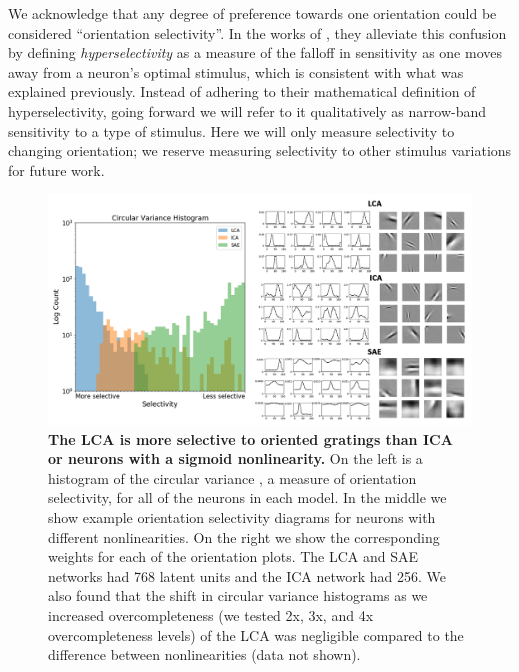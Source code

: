 We acknowledge that any degree of preference towards one orientation could be considered ``orientation selectivity''.
In the works of \parencite{golden2016conjectures,vilankar2017selectivity}, they alleviate this confusion by defining \textit{hyperselectivity} as a measure of the falloff in sensitivity as one moves away from a neuron's optimal stimulus, which is consistent with what was explained previously.
Instead of adhering to their mathematical definition of hyperselectivity, going forward we will refer to it qualitatively as narrow-band sensitivity to a type of stimulus.
Here we will only measure selectivity to changing orientation; we reserve measuring selectivity to other stimulus variations for future work.

\begin{figure}[h!]
    \centering
    \includegraphics[width=\textwidth]{figures/circular_variance_histogram.png}
    \caption{\textbf{The LCA is more selective to oriented gratings than ICA or neurons with a sigmoid nonlinearity.} On the left is a histogram of the circular variance \parencite{ringach2002orientation}, a measure of orientation selectivity, for all of the neurons in each model. In the middle we show example orientation selectivity diagrams for neurons with different nonlinearities. On the right we show the corresponding weights for each of the orientation plots. The LCA and SAE networks had 768 latent units and the ICA network had 256. We also found that the shift in circular variance histograms as we increased overcompleteness (we tested 2x, 3x, and 4x overcompleteness levels) of the LCA was negligible compared to the difference between nonlinearities (data not shown).}
    \label{fig:ch4_orientation_selectivity}
\end{figure}


